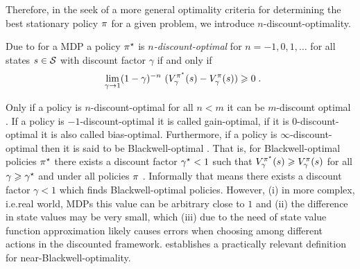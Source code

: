 \documentclass[envcountsame]{llncs}
\begin{document}
Therefore, in the seek of a more general optimality criteria for determining the best stationary
policy \(\pi\) for a given problem, we introduce \(n\)-discount-optimality.




\begin{definition}
  Due to \citet{Veinott69} for a MDP a policy \(\pi^{\star}\) is \emph{\(n\)-discount-optimal} for
  \(n=-1,0,1,\ldots\) for all states \(s \in \mathcal{S}\) with discount factor
  \(\gamma\) %
  if and only if
  \begin{align*}
    \lim_{\gamma \to 1}(1-\gamma)^{-n}\ (V_{\gamma}^{\polopt}(s) - V_{\gamma}^{\pol}(s)) \geqslant 0 \tpkt
  \end{align*}
\end{definition}


Only if a policy is \(n\)-discount-optimal for all \(n < m\) it can be \(m\)-discount
optimal \citep{Puterman94,Veinott69}.
%
If a policy is \(-1\)-discount-optimal it is called gain-optimal, if it is \(0\)-discount-optimal it
is also called bias-optimal.
%
Furthermore, if a policy is \(\infty\)-discount-optimal then it is said to be Blackwell-optimal
\citep{Blackwell62}.
%
That is, for Blackwell-optimal policies \(\pi^{\star}\) there exists a discount factor \(\gamma^{\star} < 1\)
such that \(V_{\gamma}^{\pi^{\star}}(s) \geqslant V_{\gamma}^{\pi}(s)\) for all
\(\gamma \geqslant \gamma^{\star}\) and under all policies \(\pi\)
\citep{Mahadevan96_SensitiveDiscountOptimalityUnifyingDiscountedAndAverageRewardReinforcementLearning,Blackwell62}.
Informally that means there exists a discount factor \(\gamma <1\) which finds Blackwell-optimal
policies. However, (i) in more complex, i.e.\@ real world, MDPs this value can be arbitrary close to
\(1\) and (ii) the difference in state values may be very small, which (iii) due to the need of
state value function approximation likely causes errors when choosing among different actions in the
discounted framework. \citet{schneckenreither2020average} establishes a practically relevant
definition for near-Blackwell-optimality.
\end{document}
